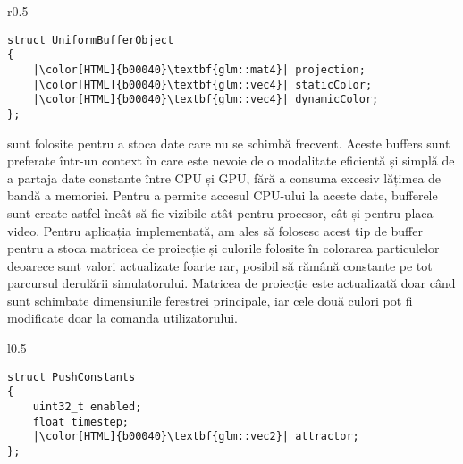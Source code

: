 \vspace{1em}
\begin{wrapfigure}{r}{0.5\textwidth}
\vspace{-1em}
\hspace{1.2cm}
\begin{minipage}{\linewidth}
\begin{verbatim}
struct UniformBufferObject
{
    |\color[HTML]{b00040}\textbf{glm::mat4}| projection;
    |\color[HTML]{b00040}\textbf{glm::vec4}| staticColor;
    |\color[HTML]{b00040}\textbf{glm::vec4}| dynamicColor;
};
\end{verbatim}
\end{minipage}
\vspace{-1em}
\end{wrapfigure}

 sunt folosite pentru a stoca date care nu se schimbă frecvent. Aceste buffers sunt preferate într-un context în care este nevoie de o modalitate eficientă și simplă de a partaja date constante între CPU și GPU, fără a consuma excesiv lățimea de bandă a memoriei. Pentru a permite accesul CPU-ului la aceste date, bufferele sunt create astfel încât să fie vizibile atât pentru procesor, cât și pentru placa video. Pentru aplicația implementată, am ales să folosesc acest tip de buffer pentru a stoca matricea de proiecție și culorile folosite în colorarea particulelor deoarece sunt valori actualizate foarte rar, posibil să rămână constante pe tot parcursul derulării simulatorului. Matricea de proiecție este actualizată doar când sunt schimbate dimensiunile ferestrei principale, iar cele două culori pot fi modificate doar la comanda utilizatorului. 

\vspace{1em}
\begin{wrapfigure}{l}{0.5\textwidth}
\vspace{-1em}
\hspace{1.5cm}
\begin{minipage}{\linewidth}
\begin{verbatim}
struct PushConstants
{
    uint32_t enabled;
    float timestep;
    |\color[HTML]{b00040}\textbf{glm::vec2}| attractor;
};
\end{verbatim}
\end{minipage}
\vspace{-1em}
\end{wrapfigure}

